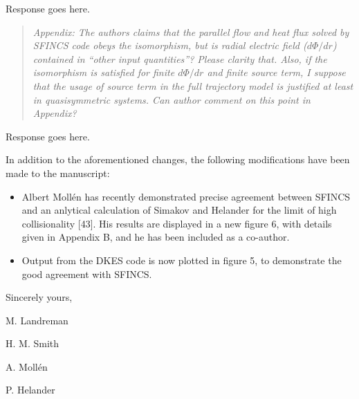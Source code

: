 \documentclass[11pt]{article}
\newenvironment{referee}{\begin{quote}\it\color{Blue}}{\end{quote}}
\begin{document}
Response goes here.

\begin{referee}
Appendix: The authors claims that the parallel flow and heat flux solved by SFINCS code obeys the
isomorphism, but is radial electric field ($d\Phi/dr$) contained in ``other input quantities''? Please
clarity that. Also, if the isomorphism is satisfied for finite $d\Phi/dr$ and finite source term, I
suppose that the usage of source term in the full trajectory model is justified at least in
quasisymmetric systems. Can author comment on this point in Appendix?
\end{referee}

Response goes here.

\vspace{0.3in}


In addition to the aforementioned changes, the following modifications have been made to the manuscript:

\begin{itemize}
\item Albert Moll\'{e}n has recently demonstrated precise agreement between SFINCS and an anlytical calculation
of Simakov and Helander for the limit of high collisionality [43]. His results are displayed in a new figure 6, with details given in Appendix B,
 and he has been included as a co-author.
\item Output from the DKES code is now plotted in figure 5, to demonstrate the good agreement with SFINCS.
\end{itemize}


Sincerely yours,\newline

M. Landreman

H. M. Smith

A. Moll\'{e}n

P. Helander
\end{document}
